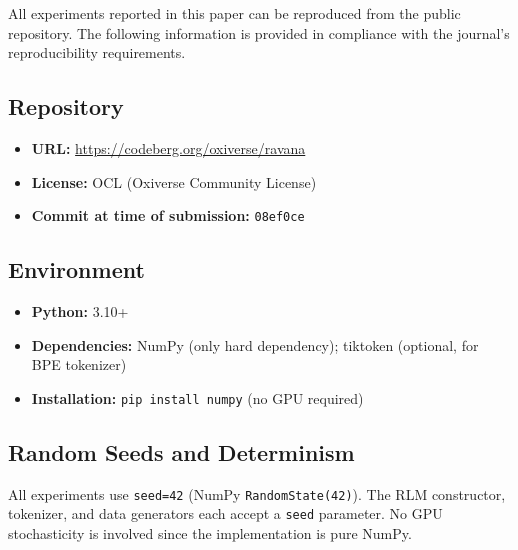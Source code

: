 \documentclass[11pt]{article}
\begin{document}
All experiments reported in this paper can be reproduced from the public repository. The following information is provided in compliance with the journal's reproducibility requirements.

\subsection{Repository}
\begin{itemize}[leftmargin=*]
    \item \textbf{URL:} \url{https://codeberg.org/oxiverse/ravana}
    \item \textbf{License:} OCL (Oxiverse Community License)
    \item \textbf{Commit at time of submission:} \texttt{08ef0ce}
\end{itemize}

\subsection{Environment}
\begin{itemize}[leftmargin=*]
    \item \textbf{Python:} 3.10+
    \item \textbf{Dependencies:} NumPy (only hard dependency); tiktoken (optional, for BPE tokenizer)
    \item \textbf{Installation:} \texttt{pip install numpy} (no GPU required)
\end{itemize}

\subsection{Random Seeds and Determinism}
All experiments use \texttt{seed=42} (NumPy \texttt{RandomState(42)}). The RLM constructor, tokenizer, and data generators each accept a \texttt{seed} parameter. No GPU stochasticity is involved since the implementation is pure NumPy.
\end{document}
